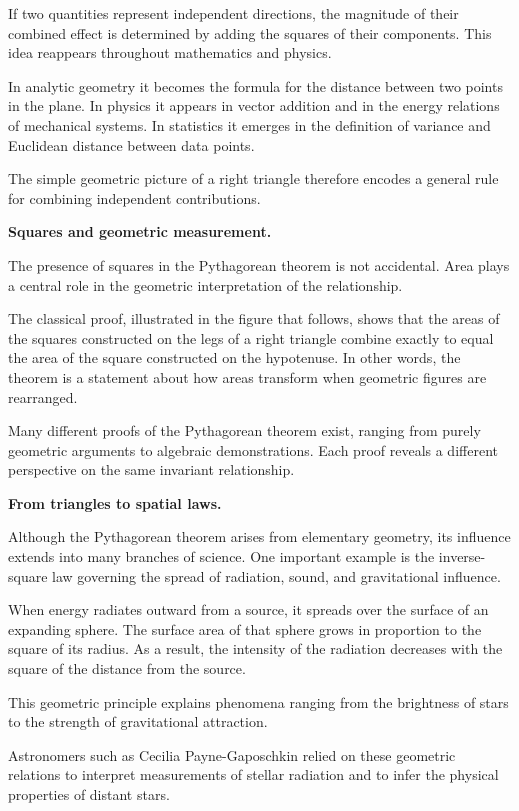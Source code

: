 \documentclass[11pt, openany]{book}
\theoremstyle{plain}
\theoremstyle{definition}
\theoremstyle{remark}
\begin{document}
If two quantities represent independent directions, the magnitude of
their combined effect is determined by adding the squares of their
components. This idea reappears throughout mathematics and physics.

In analytic geometry it becomes the formula for the distance between two
points in the plane. In physics it appears in vector addition and in the
energy relations of mechanical systems. In statistics it emerges in the
definition of variance and Euclidean distance between data points.

The simple geometric picture of a right triangle therefore encodes a
general rule for combining independent contributions.

\medskip

\textbf{Squares and geometric measurement.}

The presence of squares in the Pythagorean theorem is not accidental.
Area plays a central role in the geometric interpretation of the
relationship.

The classical proof, illustrated in the figure that follows, shows that
the areas of the squares constructed on the legs of a right triangle
combine exactly to equal the area of the square constructed on the
hypotenuse. In other words, the theorem is a statement about how areas
transform when geometric figures are rearranged.

Many different proofs of the Pythagorean theorem exist, ranging from
purely geometric arguments to algebraic demonstrations. Each proof
reveals a different perspective on the same invariant relationship.

\medskip

\textbf{From triangles to spatial laws.}

Although the Pythagorean theorem arises from elementary geometry, its
influence extends into many branches of science. One important example
is the inverse-square law governing the spread of radiation, sound, and
gravitational influence.

When energy radiates outward from a source, it spreads over the surface
of an expanding sphere. The surface area of that sphere grows in
proportion to the square of its radius. As a result, the intensity of
the radiation decreases with the square of the distance from the source.

This geometric principle explains phenomena ranging from the brightness
of stars to the strength of gravitational attraction.

Astronomers such as Cecilia Payne-Gaposchkin relied on these geometric
relations to interpret measurements of stellar radiation and to infer
the physical properties of distant stars.
\end{document}
